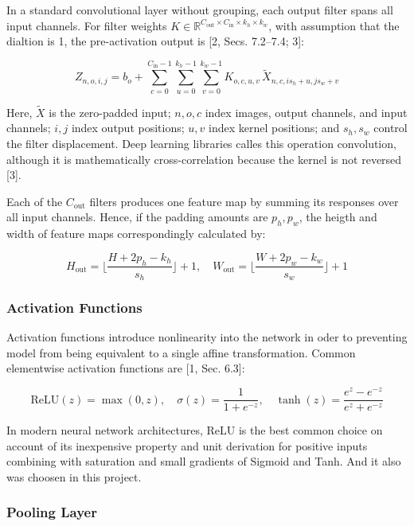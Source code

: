 \documentclass[11pt,a4paper]{article}
\begin{document}
In a standard convolutional layer without grouping, each output filter spans all input channels. For filter weights \(K\in {\mathbb{R}}^{{C}_{\mathrm{out}}\times {C}_{\mathrm{in}}\times {k}_{h}\times {k}_{w}}\), with assumption that the dialtion is 1, the pre-activation output is [2, Secs. 7.2--7.4; 3]:

\[
{Z}_{n,o,i,j}={b}_{o}+\sum _{c=0}^{{C}_{\mathrm{in}}-1} \sum _{u=0}^{{k}_{h}-1} \sum _{v=0}^{{k}_{w}-1} {K}_{o,c,u,v}\,{\tilde{X}}_{n,c,i{s}_{h}+u,j{s}_{w}+v}
\]

Here, \(\tilde{X}\) is the zero-padded input; \(n,o,c\) index images, output channels, and input channels; \(i,j\) index output positions; \(u,v\) index kernel positions; and \({s}_{h},{s}_{w}\) control the filter displacement. Deep learning libraries calles this operation convolution, although it is mathematically cross-correlation because the kernel is not reversed [3].

Each of the \({C}_{\mathrm{out}}\) filters produces one feature map by summing its responses over all input channels. Hence, if the padding amounts are \({p}_{h},{p}_{w}\), the heigth and width of feature maps correspondingly calculated by:

\[
{H}_{\mathrm{out}}=\lfloor \frac{H+2{p}_{h}-{k}_{h}}{{s}_{h}}\rfloor +1,\quad {W}_{\mathrm{out}}=\lfloor \frac{W+2{p}_{w}-{k}_{w}}{{s}_{w}}\rfloor +1
\]

\subsubsection{Activation Functions}\label{theory:2.2.3}

Activation functions introduce nonlinearity into the network in oder to preventing model from being  equivalent to a single affine transformation. Common elementwise activation functions are [1, Sec. 6.3]:

\[
\mathrm{ReLU}(z)=\max (0,z),\quad \sigma (z)=\frac{1}{1+{e}^{-z}},\quad \tanh (z)=\frac{{e}^{z}-{e}^{-z}}{{e}^{z}+{e}^{-z}}
\]

In modern neural network architectures, ReLU is the best common choice on account of its inexpensive property and unit derivation for positive inputs combining with saturation and small gradients of Sigmoid and Tanh. And it also was choosen in this project.

\subsubsection{Pooling Layer}\label{theory:2.2.4}
\end{document}
